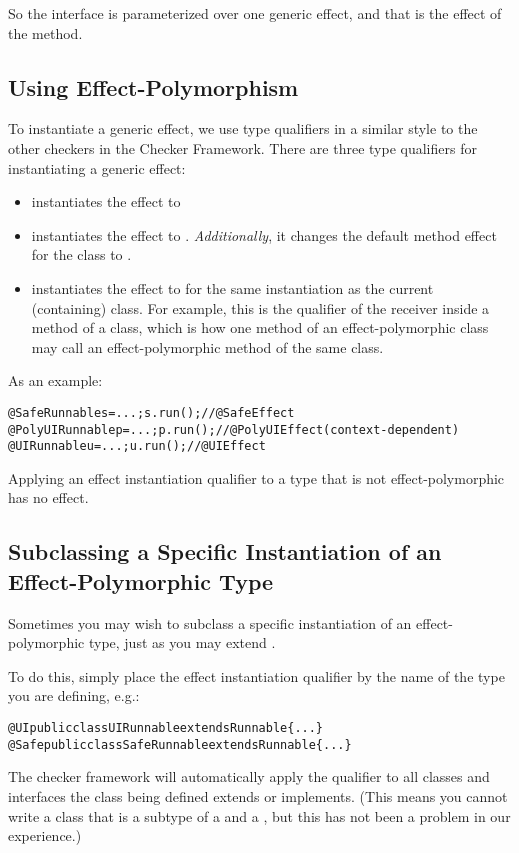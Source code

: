 So the  interface is parameterized over one generic effect, and that is the effect of
the  method.

\subsection{Using Effect-Polymorphism}
To instantiate a generic effect, we use type qualifiers in a similar style to the other checkers in the Checker Framework.
There are three type qualifiers for instantiating a generic effect:
\begin{itemize}
\item {} instantiates the effect to 
\item {} instantiates the effect to .  \emph{Additionally}, it changes the
default method effect for the class to .
\item {} instantiates the effect to  for the same instantiation as
the current (containing) class.  For example, this is the qualifier of the receiver 
inside a method of a  class, which is how one method of an effect-polymorphic
class may call an effect-polymorphic method of the same class.
\end{itemize}

As an example:

\begin{alltt}
@Safe Runnable s = ...;   s.run(); // @SafeEffect
@PolyUI Runnable p = ...; p.run(); // @PolyUIEffect (context-dependent)
@UI Runnable u = ...;     u.run(); // @UIEffect
\end{alltt}

Applying an effect instantiation qualifier to a type that is not effect-polymorphic has no effect.

\subsection{Subclassing a Specific Instantiation of an Effect-Polymorphic Type}
Sometimes you may wish to subclass a specific instantiation of an effect-polymorphic type, just as
you may extend .

To do this, simply place the effect instantiation qualifier by the name of the type you are
defining, e.g.:

\begin{alltt}
@UI public class UIRunnable extends Runnable \{...\}
@Safe public class SafeRunnable extends Runnable \{...\}
\end{alltt}
The checker framework will automatically apply the qualifier to all classes and interfaces the class
being defined extends or implements.  (This means you cannot write a class that is a subtype of a
 and a , but this has not been a problem in our experience.)

